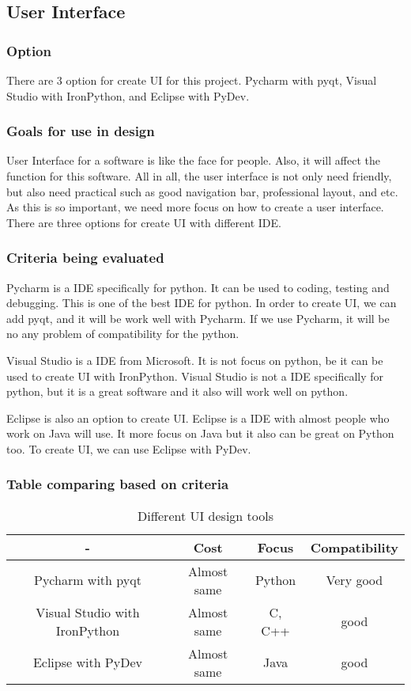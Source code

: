 \documentclass [10pt]{article}
\begin{document}
\subsection{User Interface}
\subsubsection{Option}
There are 3 option for create UI for this project. Pycharm with pyqt, Visual Studio with IronPython, and Eclipse with PyDev. 

\subsubsection{Goals for use in design}
User Interface for a software is like the face for people. Also, it will affect the function for this software. All in all, the user interface is not only need friendly, but also need practical such as good navigation bar, professional layout, and etc. As this is so important, we need more focus on how to create a user interface. There are three options for create UI with different IDE. 

\subsubsection{Criteria being evaluated}
Pycharm is a IDE specifically for python. It can be used to coding, testing and debugging. This is one of the best IDE for python. In order to create UI, we can add pyqt, and it will be work well with Pycharm. If we use Pycharm, it will be no any problem of compatibility for the python. \par
Visual Studio is a IDE from Microsoft. It is not focus on python, be it can be used to create UI with IronPython. Visual Studio is not a IDE specifically for python, but it is a great software and it also will work well on python. \par
Eclipse is also an option to create UI. Eclipse is a IDE with almost people who work on Java will use. It more focus on Java but it also can be great on Python too. To create UI, we can use Eclipse with PyDev. 

\subsubsection{Table comparing based on criteria}
\begin{table}[h]
\caption{Different UI design tools}
\label{table_example}
\begin{center}
\begin{tabular}{|c||c||c||c|}
\hline
 - & Cost & Focus & Compatibility \\
\hline
Pycharm with pyqt & Almost same & Python & Very good \\
\hline
Visual Studio with IronPython & Almost same & C, C++ & good \\
\hline
Eclipse with PyDev & Almost same & Java & good \\
\hline
\end{tabular}
\end{center}
\end{table}
\end{document}
